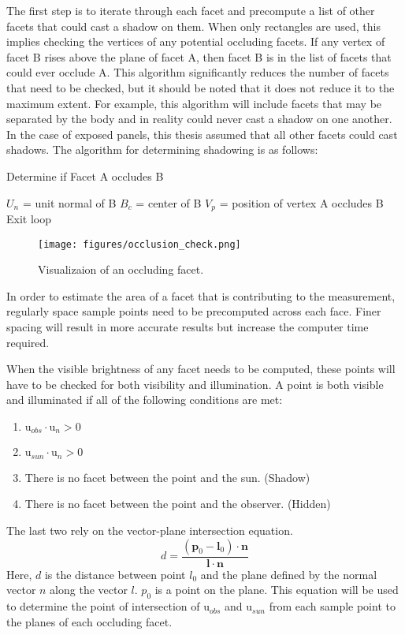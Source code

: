 The first step is to iterate through each facet and precompute a list of other facets that could cast a shadow on them. When only rectangles are used, this implies checking the vertices of any potential occluding facets. If any vertex of facet B rises above the plane of facet A, then facet B is in the list of facets that could ever occlude A. This algorithm significantly reduces the number of facets that need to be checked, but it should be noted that it does not reduce it to the maximum extent. For example, this algorithm will include facets that may be separated by the body and in reality could never cast a shadow on one another. In the case of exposed panels, this thesis assumed that all other facets could cast shadows. The algorithm for determining shadowing is as follows: 
\begin{algorithm}\label{alg:calc_obscuring}
	\caption{Determine if Facet A occludes B}
	\begin{algorithmic}
		\STATE $U_n$ = unit normal of B
		\STATE $B_c$ = center of B
		\STATE $V_p$ = position of vertex
			\STATE A occludes B
			\STATE Exit loop
		\ENDIF
		\ENDFOR
	\end{algorithmic}
\end{algorithm}
\begin{figure}[h!]
	\centering
	\texttt{[image: figures/occlusion\_check.png]}
	\caption{Visualizaion of an occluding facet.}
	\label{occluding_facet}
\end{figure}

In order to estimate the area of a facet that is contributing to the measurement, regularly space sample points need to be precomputed across each face. Finer spacing will result in more accurate results but increase the computer time required. 

When the visible brightness of any facet needs to be computed, these points will have to be checked for both visibility and illumination. A point is both visible and illuminated if all of the following conditions are met:
\begin{enumerate}
	\item $\bm{\mathrm{u}}_{obs}\cdotp \mathrm{u}_n > 0$
	\item $\bm{\mathrm{u}}_{sun}\cdotp \mathrm{u}_n > 0$
	\item There is no facet between the point and the sun. (Shadow)
	\item There is no facet between the point and the observer. (Hidden)
\end{enumerate}	
The last two rely on the vector-plane intersection equation.
\begin{equation}\label{eq:ray_distance}
d = \frac{(\bm{p}_0 - \bm{l}_0)\cdotp \bm{n}}{\bm{l}\cdotp \bm{n}}
\end{equation}
Here, $d$ is the distance between point $l_0$ and the plane defined by the normal vector $n$ along the vector $l$. $p_0$ is a point on the plane. This equation will be used to determine the point of intersection of $\bm{\mathrm{u}}_{obs}$ and $\bm{\mathrm{u}}_{sun}$ from each sample point to the planes of each occluding facet.

